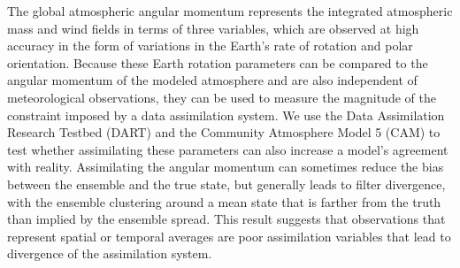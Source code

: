 The global atmospheric angular momentum represents the integrated atmospheric mass and wind fields in terms of three variables, which are observed at high accuracy in the form of variations in the Earth's rate of rotation and polar orientation. 
%
Because these Earth rotation parameters can be compared to the angular momentum of the modeled atmosphere and are also independent of meteorological observations, they can be used to measure 
the magnitude of the constraint imposed by a data assimilation system.
%
We use the Data Assimilation Research Testbed (DART) and the Community Atmosphere Model 5 (CAM) to test whether assimilating these parameters can also increase a model's agreement with reality. 
Assimilating the angular momentum can sometimes reduce the bias between the ensemble and the true state, but generally leads to filter divergence, with the ensemble clustering around a mean state that is farther from the truth than implied by the ensemble spread. 
This result suggests that observations that represent spatial or temporal averages are poor assimilation variables that lead to divergence of the assimilation system.  
